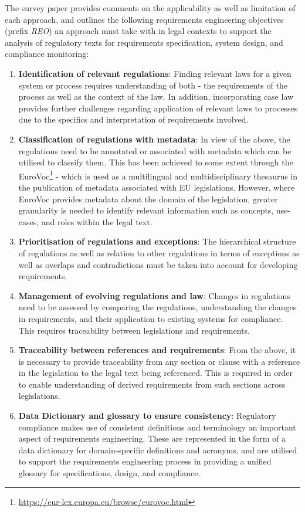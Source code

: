 The survey paper provides comments on the applicability as well as limitation of each approach, and  outlines the following requirements engineering objectives (prefix \textit{REO}) an approach must take with in legal contexts to support the analysis of regulatory texts for requirements specification, system design, and compliance monitoring:
\begin{enumerate}[label={\textit{REO.\theenumi}}]
    \item \textbf{Identification of relevant regulations}: Finding relevant laws for a given system or process requires understanding of both - the requirements of the process as well as the context of the law. In addition, incorporating case law provides further challenges regarding application of relevant laws to processes due to the specifics and interpretation of requirements involved.
    \item \textbf{Classification of regulations with metadata}: In view of the above, the regulations need to be annotated or associated with metadata which can be utilised to classify them. This has been achieved to some extent through the EuroVoc\footnote{\url{https://eur-lex.europa.eu/browse/eurovoc.html}} - which is used as a multilingual and multidisciplinary thesaurus in the publication of metadata associated with EU legislations. However, where EuroVoc provides metadata about the domain of the legislation, greater granularity is needed to identify relevant information such as concepts, use-cases, and roles within the legal text.
    \item \textbf{Prioritisation of regulations and exceptions}: The hierarchical structure of regulations as well as relation to other regulations in terms of exceptions as well as overlaps and contradictions  must be taken into account for developing requirements.
    \item \textbf{Management of evolving regulations and law}: Changes in regulations need to be assessed by comparing the regulations, understanding the changes in requirements, and their application to existing systems for compliance. This requires traceability between legislations and requirements.
    \item \textbf{Traceability between references and requirements}: From the above, it is necessary to provide traceability from any section or clause with a reference in the legislation to the legal text being referenced. This is required in order to enable understanding of derived requirements from such sections across legislations.
    \item \textbf{Data Dictionary and glossary to ensure consistency}: Regulatory compliance makes use of consistent definitions and terminology an important aspect of requirements engineering. These are represented in the form of a data dictionary for domain-specific definitions and acronyms, and are utilised to support the requirements engineering process in providing a unified glossary for specifications, design, and compliance. 

\end{enumerate}
